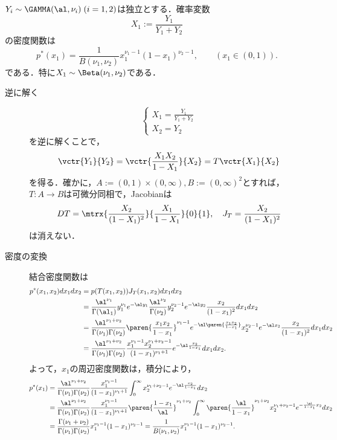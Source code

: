 \documentclass[uplatex,dvipdfmx]{jsreport}
\begin{document}
\begin{proposition}
    $Y_i\sim\GAMMA(\al,\nu_i)\;(i=1,2)$は独立とする．確率変数
    \[X_1:=\frac{Y_1}{Y_1+Y_2}\]
    の密度関数は
    \[p^*(x_1)=\frac{1}{B(\nu_1,\nu_2)}x_1^{\nu_1-1}(1-x_1)^{\nu_2-1},\qquad(x_1\in(0,1)).\]
    である．特に$X_1\sim\Beta(\nu_1,\nu_2)$である．
\end{proposition}
\begin{Proof}\mbox{}
    \begin{description}
        \item[逆に解く] \[\begin{cases}
            X_1=\frac{Y_1}{Y_1+Y_2}\\
            X_2=Y_2
        \end{cases}\]
        を逆に解くことで，
        \[\vctr{Y_1}{Y_2}=\vctr{\frac{X_1X_2}{1-X_1}}{X_2}=T\vctr{X_1}{X_2}\]
        を得る．確かに，$A:=(0,1)\times(0,\infty),B:=(0,\infty)^2$とすれば，$T:A\to B$は可微分同相で，Jacobianは
        \[DT=\mtrx{\frac{X_2}{(1-X_1)^2}}{\frac{X_1}{1-X_1}}{0}{1},\quad J_T=\frac{X_2}{(1-X_1)^2}\]
        は消えない．
        \item[密度の変換] 結合密度関数は
        \begin{align*}
            p^*(x_1,x_2)dx_1dx_2&=p(T(x_1,x_2))J_T(x_1,x_2)dx_1dx_2\\
            &=\frac{\al^{\nu_1}}{\Gamma(\al_1)}y_1^{\nu_1}e^{-\al y_1}\frac{\al^{\nu_2}}{\Gamma(\nu_2)}y_2^{\nu_2-1}e^{-\al y_2}\frac{x_2}{(1-x_1)^2}dx_1dx_2\\
            &=\frac{\al^{\nu_1+\nu_2}}{\Gamma(\nu_1)\Gamma(\nu_2)}\paren{\frac{x_1x_2}{1-x_1}}^{\nu_1-1}e^{-\al\paren{\frac{x_1x_2}{1-x_1}}}x_2^{\nu_2-1}e^{-\al x_2}\frac{x_2}{(1-x_1)^2}dx_1dx_2\\
            &=\frac{\al^{\nu_1+\nu_2}}{\Gamma(\nu_1)\Gamma(\nu_2)}\frac{x_1^{\nu_1-1}x_2^{\nu_1+\nu_2-1}}{(1-x_1)^{\nu_1+1}}e^{-\al\frac{x_2}{1-x_1}}dx_1dx_2.
        \end{align*}
        よって，$x_1$の周辺密度関数は，積分により，
        \begin{align*}
            p^*(x_1)&=\frac{\al^{\nu_1+\nu_2}}{\Gamma(\nu_1)\Gamma(\nu_2)}\frac{x_1^{\nu_1-1}}{(1-x_1)^{\nu_1+1}}\int^\infty_0x_2^{\nu_1+\nu_2-1}e^{-\al\frac{x_2}{1-x_1}}dx_2\\
            &=\frac{\al^{\nu_1+\nu_2}}{\Gamma(\nu_1)\Gamma(\nu_2)}\frac{x_1^{\nu_1-1}}{(1-x_1)^{\nu_1+1}}\paren{\frac{1-x_1}{\al}}^{\nu_1+\nu_2}\int^\infty_0\paren{\frac{\al}{1-x_1}}^{\nu_1+\nu_2}x_2^{\nu_1+\nu_2-1}e^{-\frac{\al}{1-x_1}x_2}dx_2\\
            &=\frac{\Gamma(\nu_1+\nu_2)}{\Gamma(\nu_1)\Gamma(\nu_2)}x_1^{\nu_1-1}(1-x_1)^{\nu_2-1}=\frac{1}{B(\nu_1,\nu_2)}x_1^{\nu_1-1}(1-x_1)^{\nu_2-1}.
        \end{align*}
    \end{description}
\end{Proof}
\end{document}
